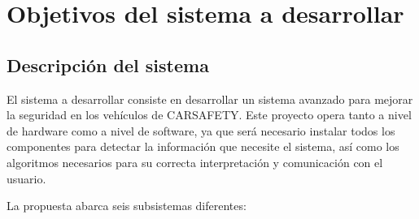 
\section{Objetivos del sistema a desarrollar}
\subsection{Descripción del sistema}
\par El sistema a desarrollar consiste en desarrollar un sistema avanzado para mejorar la seguridad en los vehículos de CARSAFETY. Este proyecto opera tanto a nivel de hardware como a nivel de software, ya que será necesario instalar todos los componentes para detectar la información que necesite el sistema, así como los algoritmos necesarios para su correcta interpretación y comunicación con el usuario.
\par La propuesta abarca seis subsistemas diferentes:

